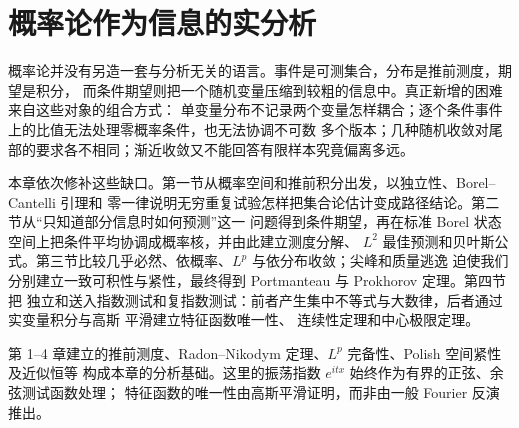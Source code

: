\chapter{概率论作为信息的实分析}\label{ch:05}

概率论并没有另造一套与分析无关的语言。事件是可测集合，分布是推前测度，期望是积分，
而条件期望则把一个随机变量压缩到较粗的信息中。真正新增的困难来自这些对象的组合方式：
单变量分布不记录两个变量怎样耦合；逐个条件事件上的比值无法处理零概率条件，也无法协调不可数
多个版本；几种随机收敛对尾部的要求各不相同；渐近收敛又不能回答有限样本究竟偏离多远。

本章依次修补这些缺口。第一节从概率空间和推前积分出发，以独立性、Borel--Cantelli 引理和
零一律说明无穷重复试验怎样把集合论估计变成路径结论。第二节从“只知道部分信息时如何预测”这一
问题得到条件期望，再在标准 Borel 状态空间上把条件平均协调成概率核，并由此建立测度分解、
$L^2$ 最佳预测和贝叶斯公式。第三节比较几乎必然、依概率、$L^p$ 与依分布收敛；尖峰和质量逃逸
迫使我们分别建立一致可积性与紧性，最终得到 Portmanteau 与 Prokhorov 定理。第四节把
独立和送入指数测试和复指数测试：前者产生集中不等式与大数律，后者通过实变量积分与高斯
平滑建立特征函数唯一性、\Levy{} 连续性定理和中心极限定理。

第 1--4 章建立的推前测度、Radon--Nikodym 定理、$L^p$ 完备性、Polish 空间紧性及近似恒等
构成本章的分析基础。这里的振荡指数 $e^{itx}$ 始终作为有界的正弦、余弦测试函数处理；
特征函数的唯一性由高斯平滑证明，而非由一般 Fourier 反演推出。





